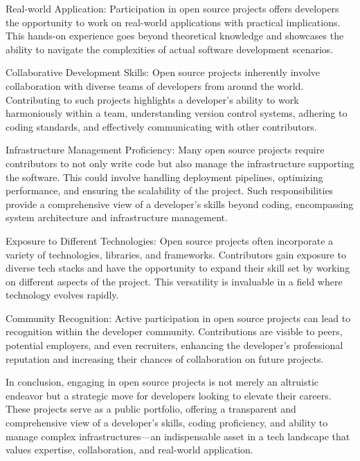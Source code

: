 \documentclass[
    a4paper, %
    10pt, %
    unnumberedsections, %
    twoside, %
]{LTJournalArticle}
\begin{document}
Real-world Application:
Participation in open source projects offers developers the opportunity to work on real-world applications with practical implications. This hands-on experience goes beyond theoretical knowledge and showcases the ability to navigate the complexities of actual software development scenarios.

Collaborative Development Skills:
Open source projects inherently involve collaboration with diverse teams of developers from around the world. Contributing to such projects highlights a developer's ability to work harmoniously within a team, understanding version control systems, adhering to coding standards, and effectively communicating with other contributors.

Infrastructure Management Proficiency:
Many open source projects require contributors to not only write code but also manage the infrastructure supporting the software. This could involve handling deployment pipelines, optimizing performance, and ensuring the scalability of the project. Such responsibilities provide a comprehensive view of a developer's skills beyond coding, encompassing system architecture and infrastructure management.

Exposure to Different Technologies:
Open source projects often incorporate a variety of technologies, libraries, and frameworks. Contributors gain exposure to diverse tech stacks and have the opportunity to expand their skill set by working on different aspects of the project. This versatility is invaluable in a field where technology evolves rapidly.

Community Recognition:
Active participation in open source projects can lead to recognition within the developer community. Contributions are visible to peers, potential employers, and even recruiters, enhancing the developer's professional reputation and increasing their chances of collaboration on future projects.

In conclusion, engaging in open source projects is not merely an altruistic endeavor but a strategic move for developers looking to elevate their careers. These projects serve as a public portfolio, offering a transparent and comprehensive view of a developer's skills, coding proficiency, and ability to manage complex infrastructures—an indispensable asset in a tech landscape that values expertise, collaboration, and real-world application.
\end{document}
